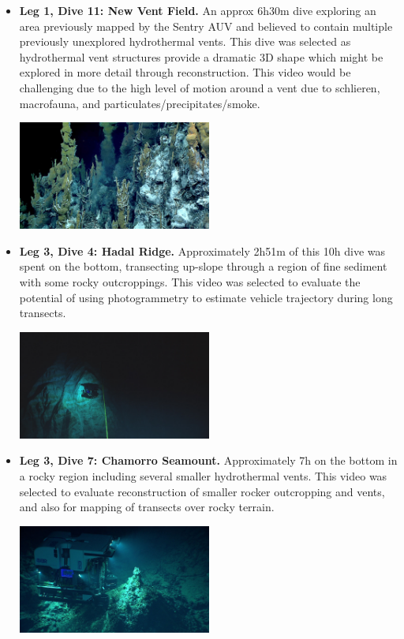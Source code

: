 \documentclass[letterpaper,12pt]{article}
\begin{document}
\begin{itemize}
    \item \textbf{Leg 1, Dive 11: New Vent Field.}   An approx 6h30m dive exploring an area previously mapped by the Sentry AUV and believed to contain multiple previously unexplored hydrothermal vents. This dive was selected as hydrothermal vent structures provide a dramatic 3D shape which might be explored in more detail through reconstruction.    This video would be challenging due to the high level of motion around a vent due to schlieren, macrofauna, and particulates/precipitates/smoke.
    
    \includegraphics[width=0.5\textwidth]{images/EX1605L1_DIVE11_highlight.jpg}
    
    \item \textbf{Leg 3, Dive 4: Hadal Ridge.}  Approximately 2h51m of this 10h dive was spent on the bottom, transecting up-slope through a region of fine sediment with some rocky outcroppings.  This video was selected to evaluate the potential of using photogrammetry to estimate vehicle trajectory during long transects.
    
    \includegraphics[width=0.5\textwidth]{images/EX1605L3_DIVE4_highlight.jpg}
    
    \item \textbf{Leg 3, Dive 7: Chamorro Seamount.}  Approximately 7h on the bottom in a rocky region including several smaller hydrothermal vents.    This video was selected to evaluate reconstruction of smaller rocker outcropping and vents, and also for mapping of transects over rocky terrain.
    
    \includegraphics[width=0.5\textwidth]{images/EX1605L3_DIVE7_highlight.jpg}
    

\end{itemize}
\end{document}
